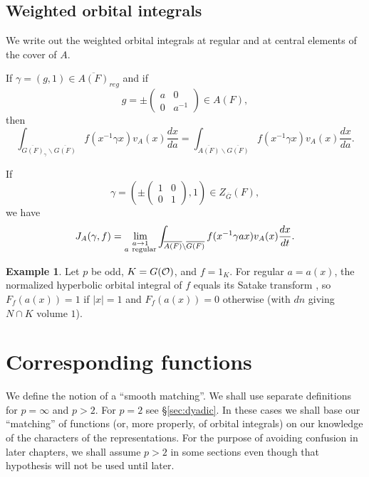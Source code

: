 \documentclass[12pt,letterpaper]{book}
\theoremstyle{plain}
\theoremstyle{definition}
\newtheorem{example}[theorem]{Example}
\theoremstyle{remark}
\theoremstyle{remark}
\begin{document}
\subsection{Weighted orbital integrals}

We write out the weighted orbital integrals at regular and at central elements of the cover of $A$.


If $\gamma =(g,1)\in \overline{A(F)}_{reg}$ and if
\[
g=
\pm \left(
\begin{array}{cc}
a & 0\\
0 & a^{-1}
\end{array}
\right)
\in A(F),
\]
then
\begin{equation}
\int_{\overline{G(F)}_\gamma\backslash \overline{G(F)}}
f(x^{-1}\gamma x)v_A(x)\frac{dx}{da}
=\int_{\overline{A(F)}\backslash \overline{G(F)}}
f(x^{-1}\gamma x)v_A(x)\frac{dx}{da}.
\end{equation}

If
\[
\gamma=
(
\pm \left(
\begin{array}{cc}
1 & 0\\
0 & 1
\end{array}
\right)
,1)\in Z_{\overline{G}}(F),
\]
we have
\begin{equation}
J_A(\gamma,f)=
\lim_{\substack{ a\rightarrow 1\\ a\ {\rm regular}}}
\int_{\overline{A(F)}\backslash \overline{G(F)}}
f(x^{-1}\gamma a x)v_A(x)\frac{dx}{dt}.
\end{equation}

\begin{example}
Let $p$ be odd, $K=G({\cal O})$, and $f=1_K$. For regular $a=a(x)$, the
normalized hyperbolic orbital integral of $f$ equals its Satake transform
\cite{C}, so $F_f(a(x))=1$ if $|x|=1$ and $F_f(a(x))=0$ otherwise (with
$dn$ giving $N\cap K$ volume $1$).
\end{example}

\section{Corresponding functions}

We define the notion of a ``smooth matching''. We shall use separate
definitions for $p=\infty$ and $p>2$. For $p=2$ see
\S\ref{sec:dyadic}.
In these cases we shall base our ``matching'' of functions (or, more
properly, of orbital integrals) on our knowledge of the characters of the
representations. For the purpose of avoiding confusion in later
chapters, we shall assume $p>2$ in some sections even though
that hypothesis will not be used until later.
\end{document}
